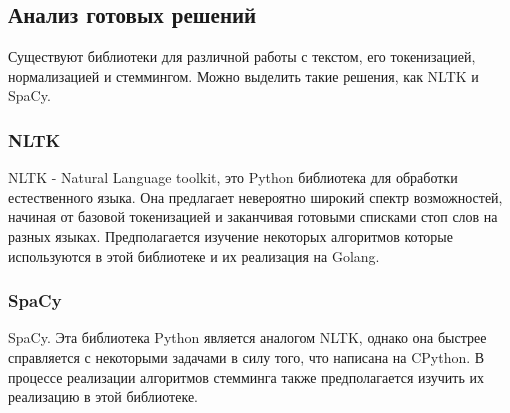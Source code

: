 \subsection{Анализ готовых решений}
Существуют библиотеки для различной работы с текстом, его токенизацией, нормализацией и стеммингом. Можно выделить такие решения, как NLTK и SpaCy. 

\subsubsection{NLTK}
NLTK - Natural Language toolkit, это Python библиотека для обработки естественного языка. Она предлагает невероятно широкий спектр возможностей, начиная от базовой токенизацией и заканчивая готовыми списками стоп слов на разных языках. Предполагается изучение некоторых алгоритмов которые используются в этой библиотеке и их реализация на Golang. 

\subsubsection{SpaCy}
SpaCy. Эта библиотека Python является аналогом NLTK, однако она быстрее справляется с некоторыми задачами в силу того, что написана на CPython. В процессе реализации алгоритмов стемминга также предполагается изучить их реализацию в этой библиотеке. 


